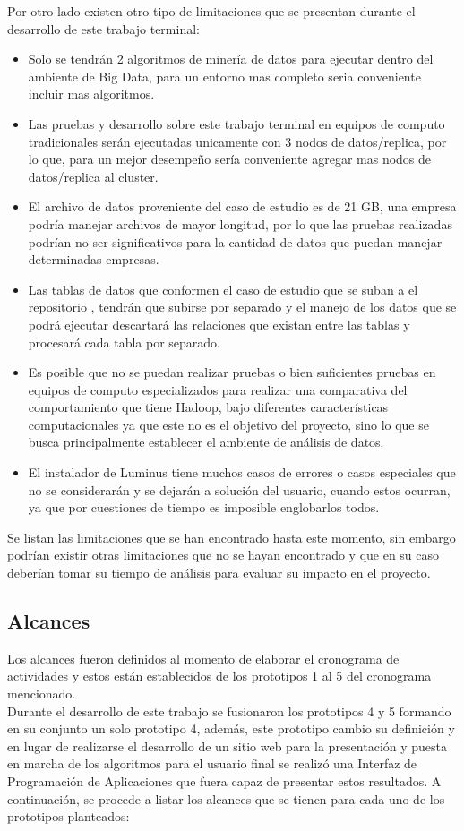 Por otro lado existen otro tipo de limitaciones que se presentan durante el desarrollo de este trabajo terminal:
\begin{itemize}
	\item Solo se tendrán 2 algoritmos de minería de datos para ejecutar dentro del ambiente de Big Data, para un entorno mas completo seria conveniente incluir mas algoritmos.
	\item Las pruebas y desarrollo sobre este trabajo terminal en equipos de computo tradicionales serán ejecutadas unicamente con 3 nodos de datos/replica, por lo que, para un mejor desempeño sería conveniente agregar mas nodos de datos/replica al cluster.
	\item El archivo de datos proveniente del caso de estudio es de 21 GB, una empresa podría manejar archivos de mayor longitud, por lo que las pruebas realizadas podrían no ser significativos para la cantidad de datos que puedan manejar determinadas empresas. 
	\item Las tablas de datos que conformen el caso de estudio que se suban a el repositorio , tendrán que subirse por separado y el manejo de los datos que se podrá ejecutar descartará las relaciones que existan entre las tablas y procesará cada tabla por separado.
	\item Es posible que no se puedan realizar pruebas o bien suficientes pruebas en equipos de computo especializados para realizar una comparativa del comportamiento que tiene Hadoop, bajo diferentes características computacionales ya que este no es el objetivo del proyecto, sino lo que se busca principalmente establecer el ambiente de análisis de datos.
	\item El instalador de Luminus tiene muchos casos de errores o casos especiales que no se considerarán y se dejarán a solución del usuario, cuando estos ocurran, ya que por cuestiones de tiempo es imposible englobarlos todos.
\end{itemize}
Se listan las limitaciones que se han encontrado hasta este momento, sin embargo podrían existir otras limitaciones que no se hayan encontrado y que en su caso deberían tomar su tiempo de análisis para evaluar su impacto en el proyecto.
\subsection{Alcances}
Los alcances fueron definidos al momento de elaborar el cronograma de actividades y estos están establecidos de los prototipos 1 al 5 del cronograma mencionado.\\ 
Durante el desarrollo de este trabajo se fusionaron los prototipos 4 y 5 formando en su conjunto un solo prototipo 4, además, este prototipo cambio su definición y en lugar de realizarse el desarrollo de un sitio web para la presentación y puesta en marcha de los algoritmos para el usuario final se realizó una Interfaz de Programación de Aplicaciones que fuera capaz de presentar estos resultados. 
A continuación, se procede a listar los alcances que se tienen para cada uno de los prototipos planteados: 
\\
